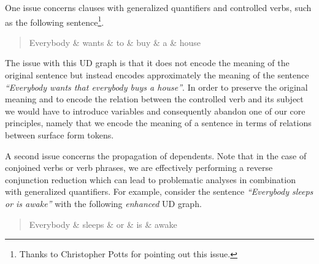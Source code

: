 \documentclass[10pt, a4paper]{article}
\begin{document}
One issue concerns clauses with generalized quantifiers and controlled verbs, such as the following sentence\footnote{Thanks to Christopher Potts for pointing out this issue.}.

\begin{quote}
\begin{center}
\begin{dependency}[column sep=0.2em, edge unit distance=2.25ex]
  \begin{deptext}
    Everybody \& wants \& to \& buy \& a \& house \\
  \end{deptext}
\end{dependency}
\end{center}
\end{quote}

The issue with this UD graph is that it does not encode the meaning of the original
sentence but instead encodes approximately the meaning of the sentence
\textit{``Everybody wants that everybody buys a house''}.
In order to preserve the original meaning and to encode the relation between the controlled
verb and its subject we would have to introduce variables and consequently abandon
one of our core principles, namely that we encode the meaning of a sentence in terms of 
relations between surface form tokens.

A second issue concerns the propagation of dependents. Note that in the case of conjoined verbs
or verb phrases, we are effectively performing a reverse conjunction reduction which can lead
to problematic analyses in combination with generalized quantifiers. For example, consider the 
sentence \textit{``Everybody sleeps or is awake''} with the following \textit{enhanced} UD graph.

\begin{quote}
\begin{center}
\begin{dependency}[column sep=0.2em, edge unit distance=2.25ex]
  \begin{deptext}
    Everybody \& sleeps \& or \& is \& awake \\
  \end{deptext}
\end{dependency}
\end{center}
\end{quote}
\end{document}
